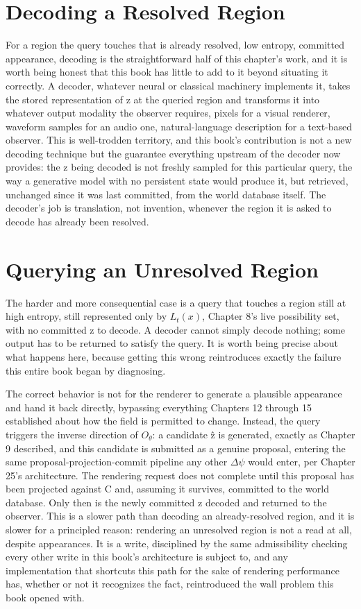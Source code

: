 \section{Decoding a Resolved Region}

For a region the query touches that is already resolved, low entropy, committed appearance, decoding is the straightforward half of this chapter's work, and it is worth being honest that this book has little to add to it beyond situating it correctly. A decoder, whatever neural or classical machinery implements it, takes the stored representation of z at the queried region and transforms it into whatever output modality the observer requires, pixels for a visual renderer, waveform samples for an audio one, natural-language description for a text-based observer. This is well-trodden territory, and this book's contribution is not a new decoding technique but the guarantee everything upstream of the decoder now provides: the z being decoded is not freshly sampled for this particular query, the way a generative model with no persistent state would produce it, but retrieved, unchanged since it was last committed, from the world database itself. The decoder's job is translation, not invention, whenever the region it is asked to decode has already been resolved.

\section{Querying an Unresolved Region}

The harder and more consequential case is a query that touches a region still at high entropy, still represented only by \(L_t(x)\), Chapter 8's live possibility set, with no committed z to decode. A decoder cannot simply decode nothing; some output has to be returned to satisfy the query. It is worth being precise about what happens here, because getting this wrong reintroduces exactly the failure this entire book began by diagnosing.

The correct behavior is not for the renderer to generate a plausible appearance and hand it back directly, bypassing everything Chapters 12 through 15 established about how the field is permitted to change. Instead, the query triggers the inverse direction of \(O_\theta\): a candidate ẑ is generated, exactly as Chapter 9 described, and this candidate is submitted as a genuine proposal, entering the same proposal-projection-commit pipeline any other \(\Delta\psi\) would enter, per Chapter 25's architecture. The rendering request does not complete until this proposal has been projected against C and, assuming it survives, committed to the world database. Only then is the newly committed z decoded and returned to the observer. This is a slower path than decoding an already-resolved region, and it is slower for a principled reason: rendering an unresolved region is not a read at all, despite appearances. It is a write, disciplined by the same admissibility checking every other write in this book's architecture is subject to, and any implementation that shortcuts this path for the sake of rendering performance has, whether or not it recognizes the fact, reintroduced the wall problem this book opened with.

